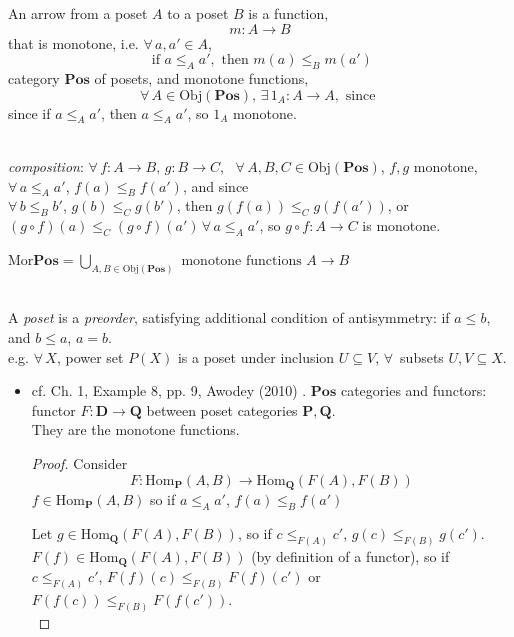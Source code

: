 \begin{itemize}
	An arrow from a poset $A$ to a poset $B$ is a function,
	\[
	m : A \to B
	\]
that is monotone, i.e. $\forall \, a, a' \in A$, 
\[
\text{ if } a \leq_A a', \text{ then } m(a) \leq_B m(a')
\]	
category $\textbf{Pos}$ of posets, and monotone functions, 
\[
\forall \, A \in \text{Obj}(\textbf{Pos}), \, \exists \, 1_A : A \to A, \text{ since } 
\]
since if $a \leq_A a'$, then $a\leq_A a'$, so $1_A$ monotone.

\quad \\ 
\emph{composition}: $\forall \, f:A \to B, \, g:B \to C$, \, $\forall \, A,B,C \in \text{Obj}(\textbf{Pos})$, $f,g$ monotone, \\
$\forall \, a \leq_A a'$, $f(a) \leq_B f(a')$, and since \\
$\forall \, b \leq_B b'$, $g(b) \leq_C g(b')$, then $g(f(a)) \leq_C g(f(a'))$, or $(g\circ f)(a) \leq_C (g\circ f)(a') \, \forall \, a\leq_A a'$, so $g\circ f : A \to C$ is monotone.

$\text{Mor}\textbf{Pos} = \bigcup_{A, B \in \text{Obj}(\textbf{Pos}) } \text{ monotone functions $A \to B$ }$  

\quad \\ 
A \emph{poset} is a \emph{preorder}, satisfying additional condition of antisymmetry:
if $a\leq b$, and $b\leq a$, $a=b$. \\
e.g. $\forall \, X$, power set $P(X)$ is a poset under inclusion $U\subseteq V$, $\forall \, $ subsets $U,V \subseteq X$.

\begin{itemize}
	\item cf. Ch. 1, Example 8, pp. 9, Awodey (2010) \cite{agat:Awod2010}.
	$\textbf{Pos}$ categories and functors: functor $F: \mathbf{D} \to \mathbf{Q}$ between poset categories $\mathbf{P}, \mathbf{Q}$. \\
	They are the monotone functions.
	\begin{proof} 
	Consider 
	\[
	F : \text{Hom}_{\mathbf{P}}(A,B) \to \text{Hom}_{\mathbf{Q}}(F(A), F(B))
	\]
	$f\in \text{Hom}_{\mathbf{P}}(A,B)$ so if $a\leq_A a'$, $f(a) \leq_B f(a')$
	
	Let $g\in \text{Hom}_{\mathbf{Q}}(F(A), F(B))$, so if $c\leq_{F(A)} c'$, $g(c)\leq_{F(B)} g(c')$. \\
	
	$F(f) \in \text{Hom}_{\mathbf{Q}}(F(A), F(B))$ (by definition of a functor), so if $c\leq_{F(A)} c'$, $F(f)(c) \leq_{F(B)} F(f)(c')$ or $F(f(c)) \leq_{F(B)} F(f(c'))$. \\
	

\end{proof}
\end{itemize}
\end{itemize}
